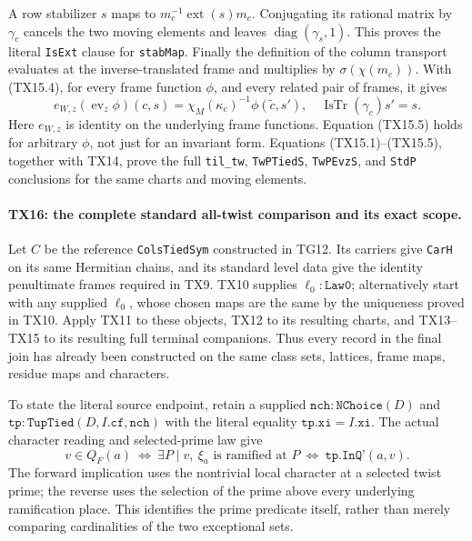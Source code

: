 A row stabilizer \(s\) maps to
\(m_c^{-1}\operatorname{ext}(s)m_c\). Conjugating its rational
matrix by \(\gamma_c\) cancels the two moving elements and
leaves \(\operatorname{diag}(\gamma_s,1)\). This proves the
literal \texttt{IsExt} clause for \texttt{stabMap}.
Finally the definition of the column transport evaluates
at the inverse-translated frame and multiplies by
\(\sigma(\chi(m_c))\). With (TX15.4), for every frame
function \(\phi\), and every related pair of frames, it gives
\[
 e_{W,z}(\operatorname{ev}_z\phi)(c,s)
       =\chi_M(\kappa_c)^{-1}\phi(\widetilde c,s'),
 \quad
 \operatorname{IsTr}(\gamma_c)s'=s.
 \tag{TX15.5}
\]
Here \(e_{W,z}\) is identity on the underlying frame functions.
Equation (TX15.5) holds for arbitrary \(\phi\), not just for
an invariant form. Equations (TX15.1)--(TX15.5), together
with TX14, prove the full \texttt{til\_tw},
\texttt{TwPTiedS}, \texttt{TwPEvzS}, and \texttt{StdP}
conclusions for the same charts and moving elements.

\paragraph{TX16: the complete standard all-twist comparison and its exact scope.}
Let \(C\) be the reference \texttt{ColsTiedSym} constructed
in TG12. Its carriers give \texttt{CarH} on its same
Hermitian chains, and its standard level data give the
identity penultimate frames required in TX9. TX10 supplies
\(\ell_0:\texttt{Law0}\); alternatively start with any
supplied \(\ell_0\), whose chosen maps are the same by the
uniqueness proved in TX10. Apply TX11 to these objects,
TX12 to its resulting charts, and TX13--TX15 to its
resulting full terminal companions. Thus every record in
the final join has already been constructed on the same
class sets, lattices, frame maps, residue maps and characters.

To state the literal source endpoint, retain a supplied
\(\texttt{nch}:\texttt{NChoice}(D)\) and
\(\texttt{tp}:\texttt{TupTied}(D,I.\texttt{cf},\texttt{nch})\)
with the literal equality \(\texttt{tp.xi}=I.\texttt{xi}\).
The actual character reading and selected-prime law give
\[
 v\in Q_F(a)
 \ \Longleftrightarrow\
 \exists P\mid v,\ \xi_a\text{ is ramified at }P
 \ \Longleftrightarrow\
 \texttt{tp.InQ'}(a,v).
 \tag{TX16.1}
\]
The forward implication uses the nontrivial local character
at a selected twist prime; the reverse uses the selection
of the prime above every underlying ramification place.
This identifies the prime predicate itself, rather than
merely comparing cardinalities of the two exceptional sets.

